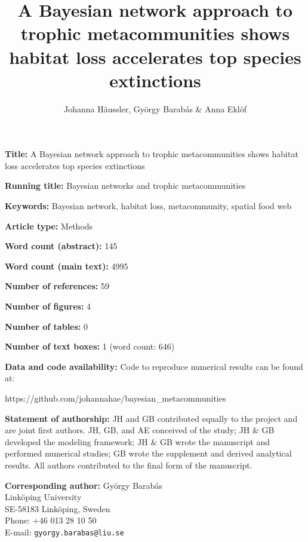 \documentclass[11pt]{article}
\title{A Bayesian network approach to trophic metacommunities shows habitat loss accelerates top species extinctions}
\author{Johanna H\"aussler, Gy\"orgy Barab\'as \& Anna Ekl\"of}
\date{}
\begin{document}
\maketitle

\doublespacing

\noindent\textbf{Title:} A Bayesian network approach to trophic metacommunities shows habitat loss accelerates top species extinctions

\noindent\textbf{Running title:} Bayesian networks and trophic metacommunities

\noindent\textbf{Keywords:} Bayesian network, habitat loss, metacommunity, spatial food web

\noindent\textbf{Article type:} Methods

\noindent\textbf{Word count (abstract):} 145

\noindent\textbf{Word count (main text):} 4995

\noindent\textbf{Number of references:} 59

\noindent\textbf{Number of figures:} 4

\noindent\textbf{Number of tables:} 0

\noindent\textbf{Number of text boxes:} 1 (word count: 646)

\noindent\textbf{Data and code availability:} Code to reproduce numerical results can be found at:
\begin{verbatim*}
https://github.com/johannahae/bayesian_metacommunities
\end{verbatim*}

\noindent\textbf{Statement of authorship:} JH and GB contributed equally to the project and are joint first authors. JH, GB, and AE conceived of the study; JH \& GB developed the modeling framework; JH \& GB wrote the manuscript and performed numerical studies; GB wrote the supplement and derived analytical results. All authors contributed to the final form of the manuscript.

\noindent\textbf{Corresponding author:} Gy\"orgy Barab\'as\\
\noindent Link\"oping University\\
\noindent SE-58183 Link\"oping, Sweden\\
\noindent Phone: +46 013 28 10 50\\
\noindent E-mail: \texttt{gyorgy.barabas@liu.se}


\linenumbers
\end{document}
